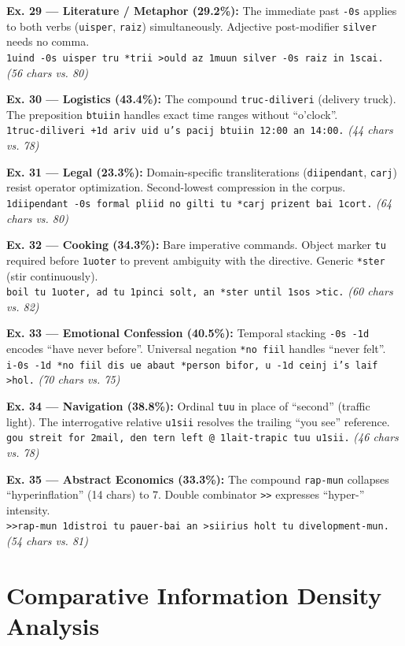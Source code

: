 \documentclass[10pt,twocolumn,letterpaper]{article}
\newcommand{\me}[1]{\texttt{#1}}
\begin{document}
\textbf{Ex. 29 --- Literature / Metaphor (29.2\%):} The immediate past \me{-0s} applies to both verbs (\me{uisper}, \me{raiz}) simultaneously. Adjective post-modifier \me{silver} needs no comma.\\
\me{1uind -0s uisper tru *trii >ould az 1muun silver -0s raiz in 1scai.} \textit{(56 chars vs. 80)}

\textbf{Ex. 30 --- Logistics (43.4\%):} The compound \me{truc-diliveri} (delivery truck). The preposition \me{btuiin} handles exact time ranges without ``o'clock''.\\
\me{1truc-diliveri +1d ariv uid u's pacij btuiin 12:00 an 14:00.} \textit{(44 chars vs. 78)}

\textbf{Ex. 31 --- Legal (23.3\%):} Domain-specific transliterations (\me{diipendant}, \me{carj}) resist operator optimization. Second-lowest compression in the corpus.\\
\me{1diipendant -0s formal pliid no gilti tu *carj prizent bai 1cort.} \textit{(64 chars vs. 80)}

\textbf{Ex. 32 --- Cooking (34.3\%):} Bare imperative commands. Object marker \me{tu} required before \me{1uoter} to prevent ambiguity with the directive. Generic \me{*ster} (stir continuously).\\
\me{boil tu 1uoter, ad tu 1pinci solt, an *ster until 1sos >tic.} \textit{(60 chars vs. 82)}

\textbf{Ex. 33 --- Emotional Confession (40.5\%):} Temporal stacking \me{-0s -1d} encodes ``have never before''. Universal negation \me{*no fiil} handles ``never felt''.\\
\me{i-0s -1d *no fiil dis ue abaut *person bifor, u -1d ceinj i's laif >hol.} \textit{(70 chars vs. 75)}

\textbf{Ex. 34 --- Navigation (38.8\%):} Ordinal \me{tuu} in place of ``second'' (traffic light). The interrogative relative \me{u1sii} resolves the trailing ``you see'' reference.\\
\me{gou streit for 2mail, den tern left @ 1lait-trapic tuu u1sii.} \textit{(46 chars vs. 78)}

\textbf{Ex. 35 --- Abstract Economics (33.3\%):} The compound \me{rap-mun} collapses ``hyperinflation'' (14 chars) to 7. Double combinator \me{>>} expresses ``hyper-'' intensity.\\
\me{>>rap-mun 1distroi tu pauer-bai an >siirius holt tu divelopment-mun.} \textit{(54 chars vs. 81)}

\section{Comparative Information Density Analysis}
\end{document}
